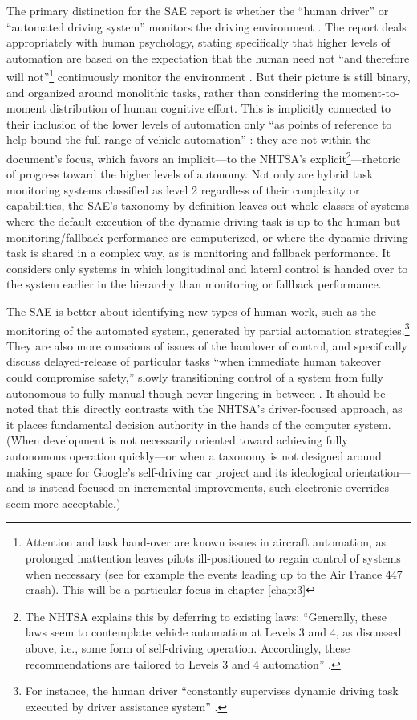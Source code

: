 The primary distinction for the SAE report is whether the ``human driver'' or ``automated
driving system'' monitors the driving environment \cite[p. 5]{SAE}. The report deals
appropriately with human psychology, stating specifically that higher
levels of automation are based on the expectation that the human need
not ``and therefore will not''\footnote{Attention and task hand-over are
  known issues in aircraft automation, as prolonged inattention leaves
  pilots ill-positioned to regain control of systems when necessary
  (see for example the events leading up to the Air France 447
  crash). This will be a particular focus in chapter \ref{chap:3}} continuously
monitor the environment \cite[p. 9]{SAE}. But their 
picture is still binary, and organized around monolithic tasks, rather
than considering the moment-to-moment 
distribution of human 
cognitive effort. This is implicitly connected to their inclusion of
the lower levels of automation only ``as points of reference to help
bound the full range of vehicle automation'' \cite[p. 2]{SAE}: they are not within
the document's focus, which favors an implicit---to the NHTSA's
explicit\footnote{The NHTSA explains this by deferring to existing
  laws: ``Generally, these laws seem to contemplate vehicle 
automation at Levels 3 and 4, as discussed above, i.e., some form of
self-driving operation. 
Accordingly, these recommendations are tailored to Levels 3 and 4
automation'' \cite[p. 10]{NHTSA}.}---rhetoric of progress toward the
higher levels of autonomy. 
Not only are hybrid task monitoring systems classified as level 2
regardless of their complexity or capabilities, the SAE's taxonomy by
definition leaves out whole classes of systems where the default
execution of the dynamic driving task is up to the human but
monitoring/fallback performance are computerized, or where the dynamic
driving task is shared in a complex way, as is monitoring and fallback
performance. It considers only systems in which longitudinal and
lateral control is handed over to the system earlier in the hierarchy
than monitoring or fallback performance.

The SAE is better about
identifying new types of human work, such as the monitoring of the
automated system, generated by partial automation
strategies.\footnote{For instance, the human driver ``constantly
  supervises dynamic driving task executed by driver assistance
  system'' \cite[p. 3]{SAE}.} They
are also more conscious of issues of the handover of control, and
specifically discuss delayed-release of particular tasks ``when
immediate human takeover could compromise safety,'' slowly
transitioning control of a system from fully autonomous to fully
manual though never lingering in between \cite[p. 4]{SAE}. It should be
noted that this directly contrasts with the NHTSA's driver-focused
approach, as it places fundamental decision authority in the hands of
the computer system. (When development is not necessarily oriented
toward achieving fully autonomous operation quickly---or when a
taxonomy is not designed around making space for Google's self-driving
car project and its ideological orientation---and is instead
focused on incremental improvements, such electronic overrides seem more acceptable.)

